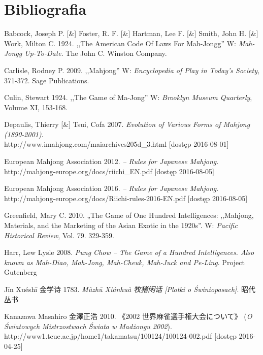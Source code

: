 \onecolumn
\section*{Bibliografia}
\setlength{\parindent}{0pt}
\setlength{\parskip}{1ex plus 0.5ex minus 0.2ex}
Babcock, Joseph P. [\&] Foster, R. F. [\&] Hartman, Lee F. [\&] Smith, John H.
[\&] Work, Milton C. 1924. ,,The American Code Of Laws For Mah-Jongg'' W:
\textit{Mah-Jongg Up-To-Date}. The John C. Winston Company. 


Carlisle, Rodney P. 2009. ,,Mahjong'' W: \textit{Encyclopedia of Play in Today's
Society}, 371-372.
Sage Publications.

Culin, Stewart 1924. ,,The Game of Ma-Jong'' W: \textit{Brooklyn Museum
Quarterly}, Volume XI, 153-168.

Depaulis, Thierry [\&] Tsui, Cofa 2007. \textit{Evolution of Various Forms of
Mahjong (1890-2001)}. 
\\http://www.imahjong.com/maiarchives205d\_3.html [dostęp
2016-08-01]

European Mahjong Association 2012. \textit{ -- Rules for Japanese Mahjong}.
\\http://mahjong-europe.org/docs/riichi\_EN.pdf [dostęp 2016-08-05]

European Mahjong Association 2016. \textit{ -- Rules for Japanese Mahjong}.
\\http://mahjong-europe.org/docs/Riichi-rules-2016-EN.pdf [dostęp 2016-08-05]

Greenfield, Mary C. 2010. „The Game of One Hundred Intelligences: ,,Mahjong,
Materials, and the Marketing of the Asian Exotic in the 1920s''. W:
\textit{Pacific Historical Review}, Vol. 79. 329-359.

Harr, Lew Lysle 2008. \textit{Pung Chow -- The Game of a Hundred Intelligences.
Also known as Mah-Diao, Mah-Jong, Mah-Cheuk, Mah-Juck and Pe-Ling}. Project
Gutenberg

Jīn Xuéshī 金学诗 1783. \textit{Mùzhū Xiánhuà 牧猪闲话 [Plotki o Świniopasach]}.
  昭代丛书

Kanazawa Masahiro 金澤正浩 2010.  《2002 世界麻雀選手権大会について》 (\textit{O Światowych Mistrzostwach
Świata w Madżongu 2002}).
\\http://www1.tcue.ac.jp/home1/takamatsu/100124/100124-002.pdf [dostęp
2016-04-25]

